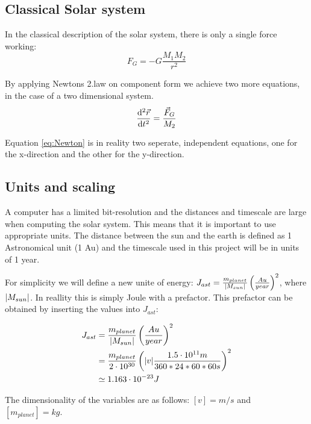 






\subsection{Classical Solar system}
In the classical description of the solar system, there is only a single force working:
\begin{equation}
 F_G = - G\frac{M_{1}M_2}{r ^2} \label{eq:F_G}
\end{equation}

By applying Newtons 2.law on component form we achieve two more equations, in the case of a two dimensional system. 
\begin{equation}
\dv[2]{\vec{r	}}{t} = \frac{\vec{F}_G}{M_2} \label{eq:Newton}
\end{equation}

Equation \ref{eq:Newton} is in reality two seperate, independent equations, one for the x-direction and the other for the y-direction. 
 
 
  
\subsection{Units and scaling}

A computer has a limited bit-resolution and the distances and timescale are large when computing the solar system. This means that it is important to use appropriate units. The distance between the sun and the earth is defined as 1 Astronomical unit (1 Au) and the timescale used in this project will be in units of 1 year. 


For simplicity we will define a new unite of energy: $ J_{ast}  = \frac{m_{planet}}{\abs{M_{sun}}} \left(\frac{Au}{year}\right)^2$, where $ \abs{M_{sun}} $. In reallity this is simply Joule with a prefactor. This prefactor can be obtained by inserting the values into $ J_{ast} $:
	
	\begin{align}
J_{ast}  &= \frac{m_{planet}}{\abs{M_{sun}}}\left(\frac{Au}{year}\right)^2\\
&= \frac{m_{planet}}{2\cdot 10^{30}}	\left(\abs{v}	\frac{1.5 \cdot 10^{11}m}{360*24*60*60 s}\right)^2\\
&\simeq 1.163\cdot 10^{-23} J
\end{align}

The dimensionality of the variables are as follows:  $ [v] = m/s $ and $ [m_{planet}] = kg $.
	



